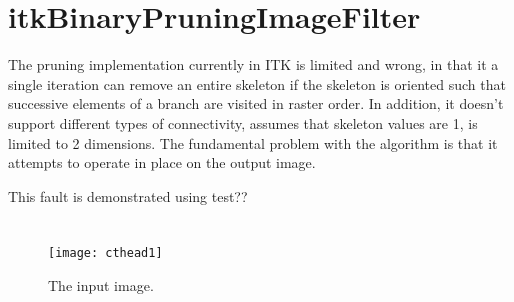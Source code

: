 \documentclass{InsightArticle}
\begin{document}
\section{itkBinaryPruningImageFilter}
The pruning implementation currently in ITK is limited and wrong, in
that it a single iteration can remove an entire skeleton if the
skeleton is oriented such that successive elements of a branch are
visited in raster order. In addition, it doesn't support different
types of connectivity, assumes that skeleton values are 1, is limited
to 2 dimensions. The fundamental problem with the algorithm is that it
attempts to operate in place on the output image.

This fault is demonstrated using test??

\section{}







\begin{figure}[htbp]
\centering
\texttt{[image: cthead1]}
\caption{The input image.\label{cthead1}}
\end{figure}


\appendix





\nocite{ITKSoftwareGuide}
\end{document}
